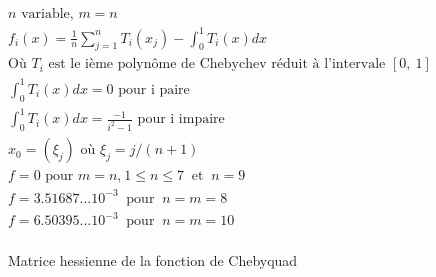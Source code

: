 \begin{align*}
n \text{ variable, } m=n \\
f_i(x)=\frac{1}{n}\sum_{j=1}^{n}T_i(x_j)-\int_0^1 \! T_i(x)dx \\
\text{O\`u }T_i\text{ est le i\`eme polynôme de Chebychev r\'eduit \`a l'intervale } [0,\ 1] \\
\int_0^1 \! T_i(x)dx= 0 \text{ pour i paire}\\
\int_0^1 \! T_i(x)dx= \frac{-1}{i^2-1} \text{ pour i impaire}\\
x_0= (\xi_j) \text{ o\`u } \xi_j=j/(n+1)\\
f=0 \text{ pour } m=n \text{,}\ 1\leq n\leq 7\ \text{ et }\ n=9\\
f=3.51687... 10^{-3}\ \text{ pour }\ n=m=8 \\
f=6.50395... 10^{-3}\ \text{ pour }\ n=m=10 \\
\end{align*}




\begin{figure}
\caption{Matrice hessienne de la fonction de Chebyquad}
\begin{center}
\end{center}
\label{fig:chebyquad}
\end{figure}





